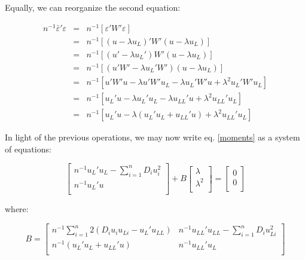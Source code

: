 \documentclass{article}
\begin{document}
Equally, we can reorganize the second equation:

\begin{eqnarray}
    n^{-1} \bar{\varepsilon}' \varepsilon & = & n^{-1} \left[ \varepsilon'W'\varepsilon
    \right] \\
    & = & n^{-1} \left[ (u - \lambda u_L)' W' (u - \lambda u_L) \right] \\
    & = & n^{-1} \left[ (u' - \lambda u_L') W' (u - \lambda u_L) \right] \\
    & = & n^{-1} \left[ (u'W' - \lambda u_L'W')(u-\lambda u_L) \right] \\
    & = & n^{-1} \left[ u'W'u - \lambda u' W' u_L - \lambda u_L'W'u + \lambda^2 u_L'W'u_L \right] \\
    & = & n^{-1} \left[ u_L' u - \lambda u_L' u_L - \lambda u_{LL}' u + \lambda^2u_{LL}' u_L \right] \\
    & = & n^{-1} \left[ u_L' u - \lambda (u_L'u_L +u_{LL}'u) + \lambda^2
    u_{LL}'u_L\right]
\end{eqnarray}

In light of the previous operations, we may now write eq. \ref{moments} as a
system of equations:


\begin{equation}
\left[ \begin{array}{c}
    n^{-1} u_L' u_L  - \sum_{i=1}^n D_i u_i^2 \\
    n^{-1} u_L' u \\
\end{array} \right]
+
B
\left[ \begin{array}{c}
    \lambda \\
    \lambda^2 \\
\end{array} \right]
=
\left[ \begin{array}{c}
    0 \\
    0 \\
\end{array} \right]
\label{syseq}
\end{equation}

where:

\[
B
=
\left[ \begin{array}{cc}
    n^{-1} \sum_{i=1}^n 2(D_i u_i u_{Li} - u_L' u_{LL}) & n^{-1}
    u_{LL}'u_{LL} - \sum_{i=1}^n D_i u_{Li}^2\\
    n^{-1} (u_L'u_L +u_{LL}'u) & n^{-1} u_{LL}'u_L \\
\end{array} \right]
\]
\end{document}
